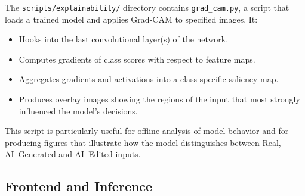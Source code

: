 The \texttt{scripts/explainability/} directory contains \texttt{grad\_cam.py}, a script that loads a trained model and applies Grad-CAM to specified images. It:
\begin{itemize}
  \item Hooks into the last convolutional layer(s) of the network.
  \item Computes gradients of class scores with respect to feature maps.
  \item Aggregates gradients and activations into a class-specific saliency map.
  \item Produces overlay images showing the regions of the input that most strongly influenced the model's decisions.
\end{itemize}

This script is particularly useful for offline analysis of model behavior and for producing figures that illustrate how the model distinguishes between Real, AI~Generated and AI~Edited inputs.

\subsection{Frontend and Inference}

